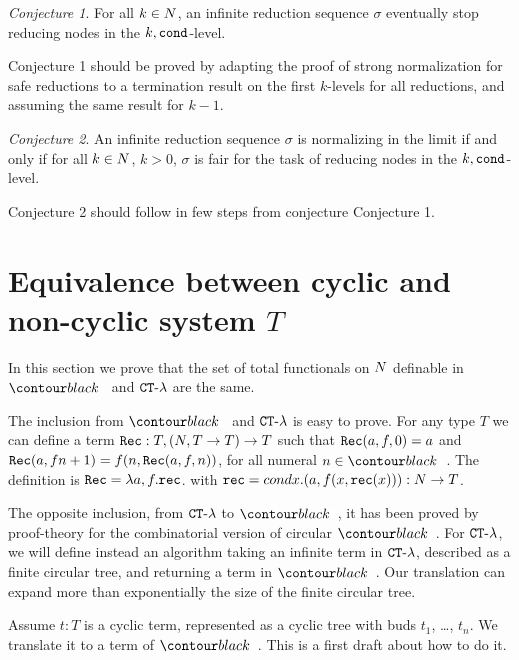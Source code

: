 \documentclass{article}
\begin{document}
\emph{Conjecture 1}. For all $k \in {N}$, an infinite reduction sequence $\sigma$ 
eventually stop reducing nodes in the $k,{\tt cond}$-level.

Conjecture 1 should be proved by adapting the proof of strong normalization for safe reductions to a
termination result on the first $k$-levels for all reductions, and assuming the same result for $k-1$.

\emph{Conjecture 2}. An infinite reduction sequence $\sigma$ 
is normalizing in the limit if and only if for all $k \in {N}$,
$k > 0$, $\sigma$ is fair for the task of reducing nodes in the $k,{\tt cond}$-level.

Conjecture 2 should follow in few steps from conjecture Conjecture 1.



\section{Equivalence between cyclic and non-cyclic system $T$} 

In this section we prove that the set of total functionals on ${N}$ definable in 
$\systemT$ and ${ {\tt CT} \mbox{-} \lambda}$ are the same.

The inclusion from $\systemT$ and ${ {\tt CT} \mbox{-} \lambda}$ is easy to prove.
For any type $T$ we can define a term ${\tt Rec}:T,({N},T \rightarrow T)\rightarrow T$ such that
${\tt Rec}(a,f,0) = a$ and ${\tt Rec}(a,fn+1) = f(n,{\tt Rec}(a,f,n))$, for all numeral $n \in \Nat$.
The definition is ${\tt Rec} = \lambda a,f.{\tt rec}$. with ${\tt rec} = cond x.(a,f(x,{\tt rec}(x))) : {N} \rightarrow T$.

The opposite inclusion, from ${ {\tt CT} \mbox{-} \lambda}$ to $\systemT$, it has been proved by proof-theory for the
combinatorial version of circular $\systemT$. For ${ {\tt CT} \mbox{-} \lambda}$, we will define instead an algorithm
taking an infinite term in  ${ {\tt CT} \mbox{-} \lambda}$, described as a finite circular tree, 
and returning a term in $\systemT$. Our translation can expand
more than exponentially the size of the finite circular tree.

Assume $t:T$ is a cyclic term, represented as a cyclic tree with buds $t_1$, \ldots, $t_n$.
We translate it to a term of $\systemT$. This is a first draft about how to do it.
 
\end{document}
